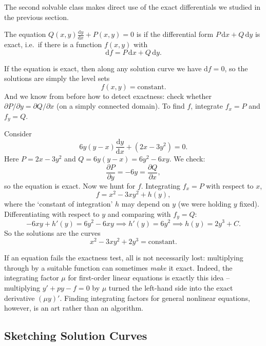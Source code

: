 \documentclass[a4paper]{scrartcl}
\begin{document}
The second solvable class makes direct use of the exact differentials we studied in the previous section.

\begin{definition}
	The equation $Q(x, y) \frac{\mathrm{d}y}{\mathrm{d}x} + P(x, y) = 0$ is  if the differential form $P \,\mathrm{d}x + Q \,\mathrm{d}y$ is exact, i.e.\ if there is a function $f(x, y)$ with
	$$
	\mathrm{d}f = P\,\mathrm{d}x + Q\,\mathrm{d}y.
	$$
\end{definition}

If the equation is exact, then along any solution curve we have $\mathrm{d}f = 0$, so the solutions are simply the level sets
$$
f(x, y) = \text{constant}.
$$
And we know from before how to detect exactness: check whether $\partial P/\partial y = \partial Q/\partial x$ (on a simply connected domain). To find $f$, integrate $f_x = P$ and $f_y = Q$.

\begin{example}
	Consider
	$$
	6y(y - x) \frac{\mathrm{d}y}{\mathrm{d}x} + (2x - 3y^2) = 0.
	$$
	Here $P = 2x - 3y^2$ and $Q = 6y(y - x) = 6y^2 - 6xy$. We check:
	$$
	\frac{\partial P}{\partial y} = -6y = \frac{\partial Q}{\partial x},
	$$
	so the equation is exact. Now we hunt for $f$. Integrating $f_x = P$ with respect to $x$,
	$$
	f = x^2 - 3xy^2 + h(y),
	$$
	where the `constant of integration' $h$ may depend on $y$ (we were holding $y$ fixed). Differentiating with respect to $y$ and comparing with $f_y = Q$:
	$$
	-6xy + h'(y) = 6y^2 - 6xy \implies h'(y) = 6y^2 \implies h(y) = 2y^3 + C.
	$$
	So the solutions are the curves
	$$
	x^2 - 3xy^2 + 2y^3 = \text{constant}.
	$$
\end{example}

\begin{remark}
	If an equation fails the exactness test, all is not necessarily lost: multiplying through by a suitable function can sometimes \emph{make} it exact. Indeed, the integrating factor $\mu$ for first-order linear equations is exactly this idea -- multiplying $y' + py - f = 0$ by $\mu$ turned the left-hand side into the exact derivative $(\mu y)'$. Finding integrating factors for general nonlinear equations, however, is an art rather than an algorithm.
\end{remark}

\subsection{Sketching Solution Curves}
\end{document}
